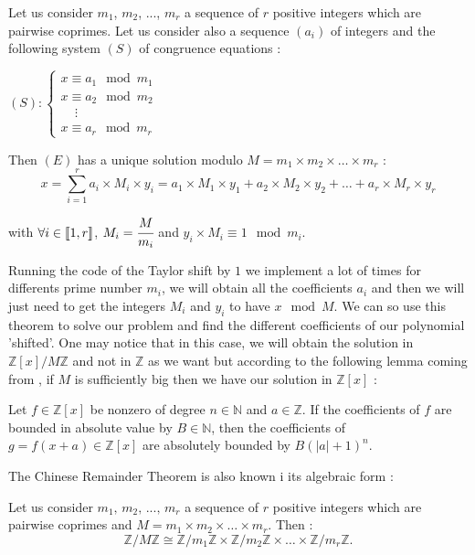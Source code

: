 \begin{crt1}
Let us consider $m_1$, $m_2$, ..., $m_r$ a sequence of $r$ positive integers which are pairwise coprimes. Let us consider also a sequence $(a_i)$ of integers and the following system $(S)$ of congruence equations :
\begin{center}
$(S) : \begin{cases}
x \equiv a_1 \mod m_1 \\
x \equiv a_2 \mod m_2 \\
\;\;\;\;\vdots \\
x \equiv a_r \mod m_r
\end{cases}$
\end{center}

Then $(E)$ has a unique solution modulo $M = m_1\times m_2\times \dots \times m_r$ : \\

$$x = \sum_{i=1}^{r} a_i\times M_i \times y_i = a_1 \times M_1 \times y_1 + a_2 \times M_2 \times y_2 + \dots + a_r \times M_r \times y_r$$

with $\forall i \in \mbox{\textlbrackdbl} 1, r\mbox{\textrbrackdbl}$, $M_i = \cfrac{M}{m_i}$ and $y_i\times M_i \equiv 1 \mod m_i$.
\end{crt1}

Running the code of the Taylor shift by $1$ we implement a lot of times for differents prime number $m_i$, we will obtain all the coefficients $a_i$ and then we will just need to get the integers $M_i$ and $y_i$ to have $x \mod M$. We can so use this theorem to solve our problem and find the different coefficients of our polynomial 'shifted'. One may notice that in this case, we will obtain the solution in $\mathbb{Z}[x]/M\mathbb{Z}$ and not in $\mathbb{Z}$ as we want but according to the following lemma coming from \cite{Gerhard}, if $M$ is sufficiently big then we have our solution in $\mathbb{Z}[x]$ :\\

\begin{lemma*}
Let $f \in \mathbb{Z}[x]$ be nonzero of degree $n\in\mathbb{N}$ and $a\in \mathbb{Z}$. If the coefficients of $f$ are bounded in absolute value by $B\in\mathbb{N}$, then the coefficients of $g=f(x+a)\in\mathbb{Z}[x]$ are absolutely bounded by $B(|a|+1)^n$.
\end{lemma*}

The Chinese Remainder Theorem is also known i its algebraic form :\\

\begin{crt2}
Let us consider $m_1,\,m_2,\,...,\, m_r$ a sequence of $r$ positive integers which are pairwise coprimes and $M = m_1\times m_2\times \dots \times m_r$. Then : 
$$\mathbb{Z}/M\mathbb{Z} \cong \mathbb{Z}/m_1\mathbb{Z} \times \mathbb{Z}/m_2\mathbb{Z} \times \dots \times \mathbb{Z}/m_r\mathbb{Z}.$$
\end{crt2}


